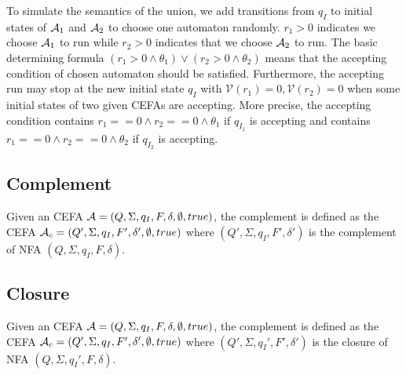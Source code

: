 To simulate the semantics of the union, we add transitions from $q_I$ to initial states of $\mathcal{A}_1$ and $\mathcal{A}_2$ to choose one automaton randomly. $r_1 > 0$ indicates we choose $\mathcal{A}_1$ to run while $r_2 > 0$ indicates that we choose $\mathcal{A}_2$ to run. The basic determining formula $(r_1>0\wedge\theta_1)\vee(r_2>0\wedge\theta_2)$ means that the accepting condition of chosen automaton should be satisfied. Furthermore, the accepting run may stop at the new initial state $q_I$ with $\mathcal{V}(r_1) = 0, \mathcal{V}(r_2)=0$ when some initial states of two given CEFAs are accepting. More precise, the accepting condition contains $r_1==0\wedge r_2==0\wedge\theta_1$ if $q_{I_1}$ is accepting and contains $r_1==0\wedge r_2==0\wedge\theta_2$ if $q_{I_2}$ is accepting.
\subsection{Complement} \label{subsec:complement}
Given an CEFA $\mathcal{A} = (Q, \Sigma, q_{I}, F, \delta, \emptyset, true)$, the complement is defined as the CEFA $\mathcal{A}_c = (Q', \Sigma, q_{I}, F', \delta', \emptyset, true)$ where $(Q', \Sigma, q_{I}, F', \delta')$ is the complement of NFA $(Q, \Sigma, q_{I}, F, \delta)$.
\subsection{Closure} \label{subsec:closure}
Given an CEFA $\mathcal{A} = (Q, \Sigma, q_{I}, F, \delta, \emptyset, true)$, the complement is defined as the CEFA $\mathcal{A}_c = (Q', \Sigma, q_{I}, F', \delta', \emptyset, true)$ where $(Q', \Sigma, q_{I}', F', \delta')$ is the closure of NFA $(Q, \Sigma, q_{I}', F, \delta)$.

